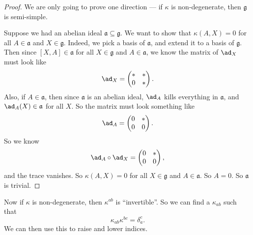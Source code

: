 \documentclass[a4paper]{article}
\begin{document}
\begin{proof}
  We are only going to prove one direction --- if $\kappa$ is non-degenerate, then $\mathfrak{g}$ is semi-simple.

  Suppose we had an abelian ideal $\mathfrak{a} \subseteq \mathfrak{g}$. We want to show that $\kappa(A, X) = 0$ for all $A \in \mathfrak{a}$ and $X \in \mathfrak{g}$. Indeed, we pick a basis of $\mathfrak{a}$, and extend it to a basis of $\mathfrak{g}$. Then since $[X, A] \in \mathfrak{a}$ for all $X \in \mathfrak{g}$ and $A \in \mathfrak{a}$, we know the matrix of $\ad_X$ must look like
  \[
    \ad_X =
    \begin{pmatrix}
      * & *\\
      0 & *
    \end{pmatrix}.
  \]
  Also, if $A \in \mathfrak{a}$, then since $\mathfrak{a}$ is an abelian ideal, $\ad_A$ kills everything in $\mathfrak{a}$, and $\ad_A(X) \in \mathfrak{a}$ for all $X$. So the matrix must look something like
  \[
    \ad_A =
    \begin{pmatrix}
      0 & *\\
      0 & 0
    \end{pmatrix}.
  \]
  So we know
  \[
    \ad_A \circ \ad_X =
    \begin{pmatrix}
      0 & *\\
      0 & 0
    \end{pmatrix},
  \]
  and the trace vanishes. So $\kappa(A, X) = 0$ for all $X \in \mathfrak{g}$ and $A \in \mathfrak{a}$. So $A = 0$. So $\mathfrak{a}$ is trivial.
\end{proof}
Now if $\kappa$ is non-degenerate, then $\kappa^{ab}$ is ``invertible''. So we can find a $\kappa_{ab}$ such that
\[
  \kappa_{ab}\kappa^{bc} = \delta_a^c.
\]
We can then use this to raise and lower indices.

%
%
\end{document}
